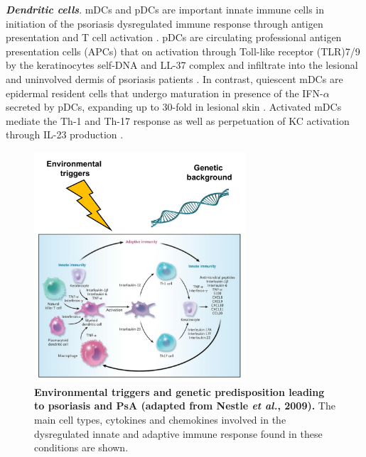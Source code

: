 \textbf{\textit{Dendritic cells}}. mDCs and pDCs are important innate immune cells in initiation of the psoriasis dysregulated immune response through antigen presentation and T cell activation \parencite{Mahil2016}. pDCs are circulating professional antigen presentation cells (APCs) that on activation through Toll-like receptor (TLR)7/9 by the keratinocytes self-DNA and LL-37 complex and infiltrate into the lesional and uninvolved dermis of psoriasis patients \parencite{Nestle2005, Lande2007}. In contrast, quiescent mDCs are epidermal resident cells that undergo maturation in presence of the IFN-$\alpha$ secreted by pDCs, expanding up to 30-fold in lesional skin \parencite{Zaba2007}. Activated mDCs mediate the Th-1 and Th-17 response as well as perpetuation of KC activation through IL-23 production \parencite{Lee2004}. %


\begin{figure}[htbp]
\centering
\includegraphics[width=0.7\textwidth]{./Introduction/pdfs/PSO_adaptive_innate_immune_system_crosstalk.pdf}
\caption[Environmental triggers and genetic predisposition leading to psoriasis and PsA (adapted from Nestle \textit{et al.}, 2009).]{\textbf{Environmental triggers and genetic predisposition leading to psoriasis and PsA (adapted from Nestle \textit{et al.}, 2009).} The main cell types, cytokines and chemokines involved in the dysregulated innate and adaptive immune response found in these conditions are shown.}
\label{fig:PSO_immune_system_diagram}
\end{figure}

